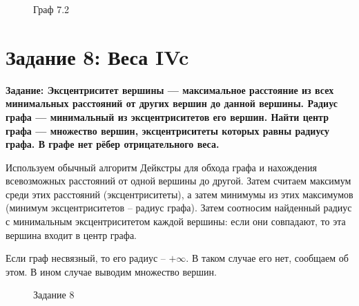 \documentclass[otchet]{SCWorks}
\begin{document}
\begin{figure}[H]
	\caption{Граф 7.2}
	\label{gr7_2}
\end{figure}
\section{Задание 8: Веса IVc}

\textbf{Задание: Эксцентриситет вершины — максимальное расстояние из всех минимальных расстояний от других вершин до данной вершины. Радиус графа — минимальный из эксцентриситетов его вершин. Найти центр графа — множество вершин, эксцентриситеты которых равны радиусу графа. В графе нет рёбер отрицательного веса.}

Используем обычный алгоритм Дейкстры для обхода графа и нахождения всевозможных расстояний от одной вершины до другой. Затем считаем максимум среди этих расстояний (эксцентриситеты), а затем минимумы из этих максимумов (минимум эксцентриситетов -- радиус графа). Затем соотносим найденный радиус с минимальным эксцентриситетом каждой вершины: если они совпадают, то эта вершина входит в центр графа.

Если граф несвязный, то его радиус -- $+\infty$. В таком случае его нет, сообщаем об этом. В ином случае выводим множество вершин.

\begin{figure}[H]
	\caption{Задание 8}
	\label{pic8_1}
\end{figure}
\end{document}
